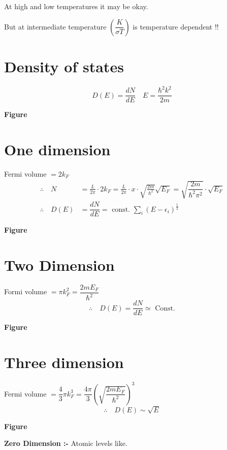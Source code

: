 At high and low temperatures it may be okay.

But at intermediate temperature $\left(\dfrac{K}{\sigma T}\right)$ is temperature dependent !!

\section*{Density of states}
$$
D(E)=\dfrac{dN}{dE}\quad E=\dfrac{\hbar^{2}k^{2}}{2m}
$$
\begin{center}
{\bf Figure}
\end{center}

\section*{One dimension}

Fermi volume $=2k_{F}$
\begin{align*}
\therefore\quad N &= \frac{L}{2\pi}\cdot 2k_{F}=\frac{L}{2\pi}\cdot x\cdot \sqrt{\frac{2m}{\hbar^{2}}}\sqrt{E_{F}}=\sqrt{\dfrac{2m}{\hbar^{2}\pi^{2}}}\cdot \sqrt{E_{F}}\\
\therefore\quad D(E) &= \dfrac{dN}{dE}=\text{ const. } \sum\limits_{i}(E-\epsilon_{i})^{\frac{1}{2}}
\end{align*}
\begin{center}
{\bf Figure}
\end{center}

\section*{Two Dimension}

Formi volume $=\pi k^{2}_{F}=\dfrac{2m E_{F}}{\hbar^{2}}$
$$
\therefore\quad D(E)=\dfrac{dN}{dE}\simeq \text{ Const.}
$$
\begin{center}
{\bf Figure}
\end{center}

\section*{Three dimension}

Fermi volume $=\dfrac{4}{3}\pi k^{3}_F{}=\dfrac{4\pi}{3}\left(\sqrt{\dfrac{2mE_{F}}{\hbar^{2}}}\right)^{3}$
$$
\therefore\quad D(E)\sim \sqrt{E}
$$
\begin{center}
{\bf Figure}
\end{center}

\noindent
{\bf Zero Dimension :- } Atomic levels like.

